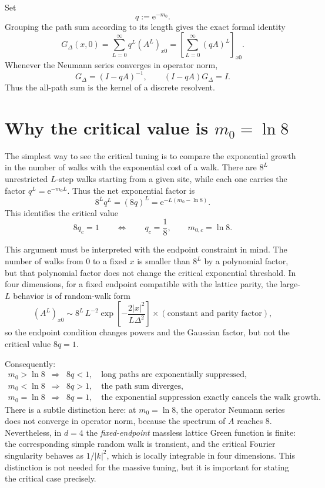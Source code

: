 \documentclass[11pt]{article}
\newcommand{\e}{\mathrm e}
\begin{document}
	Set
	\[
	q:=\e^{-m_0}.
	\]
	Grouping the path sum according to its length gives the exact formal identity
	\begin{equation}
		\label{eq:path-series}
		G_\Delta(x,0)
		=\sum_{L=0}^\infty q^L(A^L)_{x0}
		=\left[\sum_{L=0}^\infty(qA)^L\right]_{x0}.
	\end{equation}
	Whenever the Neumann series converges in operator norm,
	\begin{equation}
		\label{eq:resolvent}
		G_\Delta=(I-qA)^{-1},
		\qquad
		(I-qA)G_\Delta=I.
	\end{equation}
	Thus the all-path sum is the kernel of a discrete resolvent.
	
	\section{Why the critical value is $m_0=\ln8$}
	The simplest way to see the critical tuning is to compare the exponential growth in the number of walks with the exponential cost of a walk. There are $8^L$ unrestricted $L$-step walks starting from a given site, while each one carries the factor $q^L=\e^{-m_0L}$. Thus the net exponential factor is
	\[
	8^Lq^L=(8q)^L=\e^{-L(m_0-\ln8)}.
	\]
	This identifies the critical value
	\begin{equation}
		\label{eq:critical}
		8q_c=1
		\qquad\Longleftrightarrow\qquad
		q_c=\frac18,
		\qquad
		m_{0,c}=\ln8.
	\end{equation}
	
	This argument must be interpreted with the endpoint constraint in mind. The number of walks from $0$ to a fixed $x$ is smaller than $8^L$ by a polynomial factor, but that polynomial factor does not change the critical exponential threshold. In four dimensions, for a fixed endpoint compatible with the lattice parity, the large-$L$ behavior is of random-walk form
	\[
	(A^L)_{x0}\sim 8^L\,L^{-2}
	\exp\!\left[-\frac{2|x|^2}{L\Delta^2}\right]
	\times(\text{constant and parity factor}),
	\]
	so the endpoint condition changes powers and the Gaussian factor, but not the critical value $8q=1$.
	
	Consequently:
	\[
	\begin{array}{lll}
		m_0>\ln8 &\Longrightarrow& 8q<1,\quad \text{long paths are exponentially suppressed},\\[2mm]
		m_0<\ln8 &\Longrightarrow& 8q>1,\quad \text{the path sum diverges},\\[2mm]
		m_0=\ln8 &\Longrightarrow& 8q=1,\quad \text{the exponential suppression exactly cancels the walk growth}.
	\end{array}
	\]
	There is a subtle distinction here: at $m_0=\ln8$, the operator Neumann series does not converge in operator norm, because the spectrum of $A$ reaches $8$. Nevertheless, in $d=4$ the \emph{fixed-endpoint} massless lattice Green function is finite: the corresponding simple random walk is transient, and the critical Fourier singularity behaves as $1/|k|^2$, which is locally integrable in four dimensions. This distinction is not needed for the massive tuning, but it is important for stating the critical case precisely.
	
\end{document}
